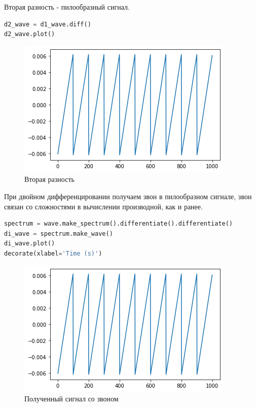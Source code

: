 Вторая разность - пилообразный сигнал.

\begin{lstlisting}[language=Python]
d2_wave = d1_wave.diff()
d2_wave.plot()
\end{lstlisting}
\begin{figure}[H]
	\begin{center}
		\includegraphics[scale=1]{fig/lab09/lab09_32_0.png}
		\caption{Вторая разность}
	\end{center}
\end{figure}

При двойном дифференцировании получаем звон в пилообразном сигнале, звон связан со сложностями в вычислении производной, как и ранее.

\begin{lstlisting}[language=Python]
spectrum = wave.make_spectrum().differentiate().differentiate()
di_wave = spectrum.make_wave()
di_wave.plot()
decorate(xlabel='Time (s)')
\end{lstlisting}
\begin{figure}[H]
	\begin{center}
		\includegraphics[scale=1]{fig/lab09/lab09_32_0.png}
		\caption{Полученный сигнал со звоном}
	\end{center}
\end{figure}


